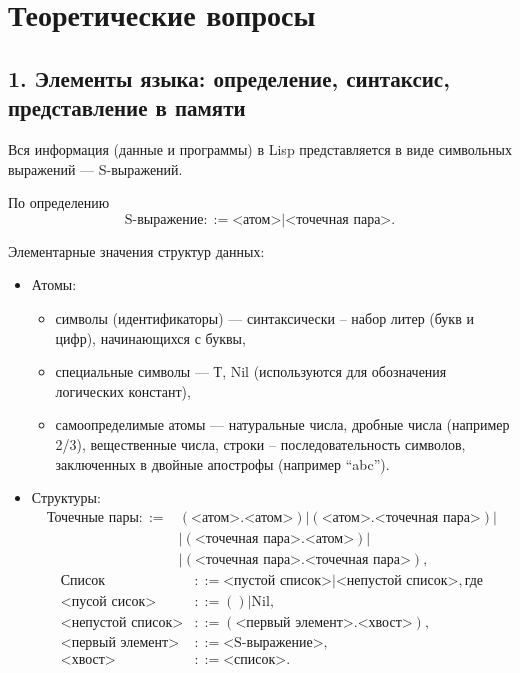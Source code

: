 \section*{Теоретические вопросы}

\subsection*{1. Элементы языка: определение, синтаксис,\\представление в памяти}
Вся информация (данные и программы) в Lisp представляется в виде символьных
выражений --- S-выражений.

По определению
\begin{equation*}
    \text{S-выражение} ::= \text{<атом>} | \text{<точечная пара>}.
\end{equation*}

Элементарные значения структур данных:
\begin{itemize}
    \item Атомы:
        \begin{itemize}
            \item символы (идентификаторы) --- синтаксически – набор литер
                  (букв и цифр), начинающихся с буквы,
            \item специальные символы --- {Т, Nil} (используются для обозначения
                  логических констант),
            \item самоопределимые атомы --- натуральные числа, дробные числа
                  (например 2/3), вещественные числа, строки –
                  последовательность символов, заключенных в двойные апострофы
                  (например “abc”).
        \end{itemize}
    \item Структуры:
        \begin{align*}
            \text{Точечные пары} ::= & (\text{<атом>}.\text{<атом>}) | (\text{<атом>}.\text{<точечная пара>}) | \\
                                     & | (\text{<точечная пара>}.\text{<атом>}) | \\
                                     & | (\text{<точечная пара>}.\text{<точечная пара>}),
        \end{align*}
        \begin{align*}
            \text{Список} & ::= \text{<пустой список>} | \text{<непустой список>}, \text{где} \\
            \text{<пусой сисок>} & ::= ( ) | \text{Nil}, \\
            \text{<непустой список>} & ::= (\text{<первый элемент>} . \text{<хвост>}), \\
            \text{<первый элемент>} & ::= \text{<S-выражение>}, \\
            \text{<хвост>} & ::= \text{<список>}.
        \end{align*}
\end{itemize}

